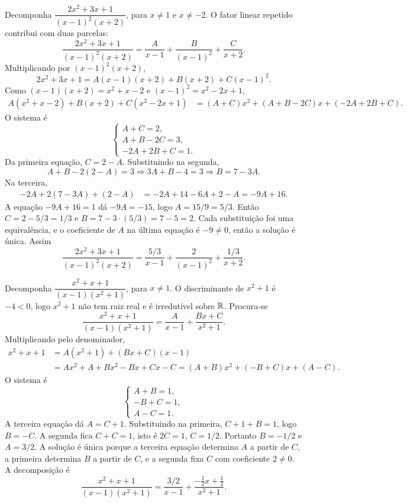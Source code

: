 \documentclass[11pt,a4paper]{article}
\begin{document}
\begin{exemplo}\label{ex:fp-repetido}
Decomponha $\dfrac{2x^2+3x+1}{(x-1)^2(x+2)}$, para $x\neq 1$ e $x\neq -2$. O fator linear repetido contribui com duas parcelas:
\[
\frac{2x^2+3x+1}{(x-1)^2(x+2)}
=\frac{A}{x-1}+\frac{B}{(x-1)^2}+\frac{C}{x+2}.
\]
Multiplicando por $(x-1)^2(x+2)$,
\[
2x^2+3x+1=A(x-1)(x+2)+B(x+2)+C(x-1)^2.
\]
Como $(x-1)(x+2)=x^2+x-2$ e $(x-1)^2=x^2-2x+1$,
\begin{align*}
A(x^2+x-2)+B(x+2)+C(x^2-2x+1)
&=(A+C)x^2+(A+B-2C)x+(-2A+2B+C).
\end{align*}
O sistema é
\begin{equation}
\begin{cases}
A+C=2,\\
A+B-2C=3,\\
-2A+2B+C=1.
\end{cases}
\label{eq:fp-repetido}
\end{equation}
Da primeira equação, $C=2-A$. Substituindo na segunda,
\[
A+B-2(2-A)=3\Longrightarrow 3A+B-4=3\Longrightarrow B=7-3A.
\]
Na terceira,
\begin{align*}
-2A+2(7-3A)+(2-A)
&=-2A+14-6A+2-A
=-9A+16.
\end{align*}
A equação $-9A+16=1$ dá $-9A=-15$, logo $A=15/9=5/3$. Então $C=2-5/3=1/3$ e $B=7-3\cdot(5/3)=7-5=2$. Cada substituição foi uma equivalência, e o coeficiente de $A$ na última equação é $-9\neq 0$, então a solução é única. Assim
\[
\frac{2x^2+3x+1}{(x-1)^2(x+2)}
=\frac{5/3}{x-1}+\frac{2}{(x-1)^2}+\frac{1/3}{x+2}.
\]
\end{exemplo}

\begin{exemplo}\label{ex:fp-quad}
Decomponha $\dfrac{x^2+x+1}{(x-1)(x^2+1)}$, para $x\neq 1$. O discriminante de $x^2+1$ é $-4<0$, logo $x^2+1$ não tem raiz real e é irredutível sobre $\mathbb{R}$. Procura-se
\[
\frac{x^2+x+1}{(x-1)(x^2+1)}=\frac{A}{x-1}+\frac{Bx+C}{x^2+1}.
\]
Multiplicando pelo denominador,
\begin{align*}
x^2+x+1
&=A(x^2+1)+(Bx+C)(x-1)\\
&=Ax^2+A+Bx^2-Bx+Cx-C
=(A+B)x^2+(-B+C)x+(A-C).
\end{align*}
O sistema é
\begin{equation}
\begin{cases}
A+B=1,\\
-B+C=1,\\
A-C=1.
\end{cases}
\label{eq:fp-quad}
\end{equation}
A terceira equação dá $A=C+1$. Substituindo na primeira, $C+1+B=1$, logo $B=-C$. A segunda fica $C+C=1$, isto é $2C=1$, $C=1/2$. Portanto $B=-1/2$ e $A=3/2$. A solução é única porque a terceira equação determina $A$ a partir de $C$, a primeira determina $B$ a partir de $C$, e a segunda fixa $C$ com coeficiente $2\neq 0$. A decomposição é
\[
\frac{x^2+x+1}{(x-1)(x^2+1)}
=\frac{3/2}{x-1}+\frac{-\frac12 x+\frac12}{x^2+1}.
\]
\end{exemplo}
\end{document}
